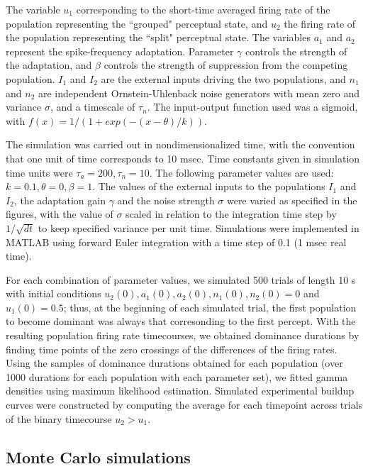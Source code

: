 \documentclass{frontiersSCNS} %
\begin{document}
The variable $u_1$ corresponding to the short-time averaged firing rate of the population representing the ``grouped" perceptual state, and $u_2$ the firing rate of the population representing the ``split" perceptual state. The variables $a_1$ and $a_2$ represent the spike-frequency adaptation. Parameter $\gamma$ controls the strength of the adaptation, and $\beta$ controls the strength of suppression from the competing population. $I_1$ and $I_2$ are the external inputs driving the two populations, and $n_1$ and $n_2$ are independent Ornstein-Uhlenback noise generators with mean zero and variance $\sigma$, and a timescale of $\tau_n$. 
The input-output function used was a sigmoid, with $f (x) = 1/(1 + exp(−(x − \theta )/ k))$. 

The simulation was carried out in nondimensionalized time, with the convention that one unit of time corresponds to 10 msec. Time constants given in simulation time units were $\tau_a = 200, \tau_n = 10$. The following parameter values are used: $k = 0.1, \theta = 0, \beta = 1$.  The values of the external inputs to the populations $I_1$ and $I_2$, the adaptation gain $\gamma$ and the noise strength $\sigma$ were varied as specified in the figures, with the value of $\sigma$ scaled in relation to the integration time step by $1/\sqrt{dt}$ to keep specified variance per unit time. Simulations were implemented in MATLAB using forward Euler integration with a time step of 0.1 (1 msec real time).

For each combination of parameter values, we simulated 500 trials of length 10 s with initial conditions $u_2(0), a_1(0), a_2(0), n_1(0), n_2(0) = 0$ and $u_1(0) = 0.5$; thus, at the beginning of each simulated trial, the first population to become dominant was always that corresonding to the first percept. With the resulting population firing rate timecourses, we obtained dominance durations by finding time points of the zero crossings of the differences of the firing rates. Using the samples of dominance durations obtained for each population (over 1000 durations for each population with each parameter set), we fitted gamma densities using maximum likelihood estimation. Simulated experimental buildup curves were constructed by computing the average for each timepoint across trials of the binary timecourse $u_2 > u_1$. 


\subsection{Monte Carlo simulations}
\end{document}
